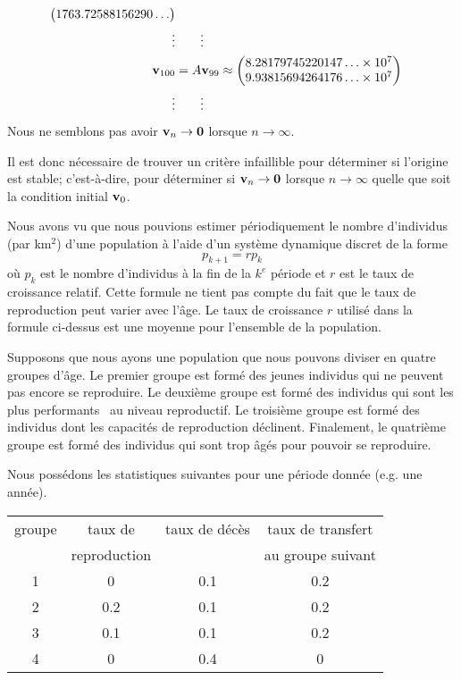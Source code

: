 {\begin{egg}
\begin{align*}
\begin{pmatrix}
1763.72588156290\ldots \end{pmatrix} \\
\vdots & \qquad \vdots \\
\mathbf{v}_{100} &= A \mathbf{v}_{99} \approx
\begin{pmatrix}
8.28179745220147\ldots \times 10^7 \\
9.93815694264176\ldots \times 10^7
\end{pmatrix} \\
\vdots & \qquad \vdots
\end{align*}
Nous ne semblons pas avoir $\mathbf{v}_n \to \mathbf{0}$ lorsque $n \to \infty$.
\end{egg}

Il est donc nécessaire de trouver un critère infaillible pour
déterminer si l'origine est stable; c'est-à-dire, pour déterminer si
$\mathbf{v}_n \to \mathbf{0}$ lorsque $n \to \infty$ quelle que soit la
condition initial $\mathbf{v}_0$.

\begin{egg}
Nous avons vu que nous pouvions estimer périodiquement le nombre d'individus
(par km$^2$) d'une population à l'aide d'un système dynamique discret
de la forme
\begin{equation}\label{oneDDDS}
p_{k+1} = r p_k
\end{equation}
où $p_k$ est le nombre d'individus à la fin de la $k^e$ période et $r$
est le taux de croissance relatif.  Cette formule ne tient pas compte
du fait que le taux de reproduction peut varier avec l'âge.  Le taux
de croissance $r$ utilisé dans la formule ci-dessus est une moyenne
pour l'ensemble de la population.

Supposons que nous ayons une population que nous pouvons diviser en quatre
groupes d'âge.  Le premier groupe est formé des jeunes individus qui
ne peuvent pas encore se reproduire.  Le deuxième groupe est formé des
individus qui sont les plus \lgm performants \rgm\ au niveau
reproductif.  Le troisième groupe est formé des individus dont les
capacités de reproduction déclinent. Finalement, le quatrième groupe
est formé des individus qui sont trop âgés pour pouvoir se reproduire.

Nous possédons les statistiques suivantes pour une période donnée
(e.g. une année).
\begin{center}
\begin{tabular}{c|c|c|c}
groupe & taux de & taux de décès & taux de transfert \\
& reproduction & & au groupe suivant \\
\hline
1 & 0 & 0.1 & 0.2 \\
2 & 0.2 & 0.1 & 0.2 \\
3 & 0.1 & 0.1 & 0.2 \\
4 & 0 & 0.4 & 0 \\
\hline
\end{tabular}
\end{center}


\end{egg}}

